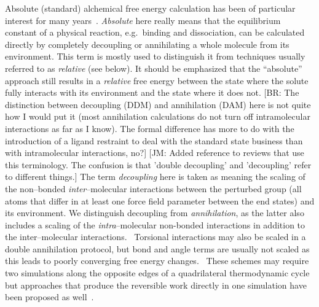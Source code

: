 \documentclass[journal=jctcce,manuscript=article]{achemso}
\begin{document}
Absolute (standard) alchemical free energy calculation has been of
particular interest for many years~\cite{GILSON19971047,
  doi:10.1021/jp0217839, deng_computations_2009, ytreberg_comparison_2006, doi:10.1021/ct500964e, jorgensen1988efficient}.  \emph{Absolute}
here really means that the equilibrium constant of a physical
reaction, e.g.\ binding and dissociation, can be calculated directly
by completely decoupling or annihilating a whole molecule from its environment.
This term is mostly used to distinguish it from techniques usually
referred to as \emph{relative} (see below).  It should be emphasized that the
``absolute'' approach still results in a \emph{relative} free energy
between the state where the solute fully interacts with its environment and the state where it does
not.  
{\color{red}
{\footnotesize [BR: The distinction between decoupling (DDM) and annihilation (DAM) here is not quite how I would put it (most annihilation calculations do not turn off intramolecular interactions as far as I know). 
The formal difference has more to do with the introduction of a ligand restraint to deal with the standard state business than with intramolecular interactions, no?]}}
{\color{blue}
{\footnotesize [JM: Added reference to reviews that use this terminology. The confusion is that 'double decoupling' and 'decoupling' refer to different things.]
}}
The term \emph{decoupling} here is taken as meaning the scaling of the non--bonded \emph{inter}--molecular interactions between the perturbed group (all atoms
that differ in at least one force field parameter between the end states) and
its environment.  We distinguish decoupling from \emph{annihilation},
as the latter also includes a scaling of
the \emph{intra}--molecular non-bonded interactions in addition to the
inter--molecular interactions.~\cite{shirtsmobleyreview_2013} {\color{blue}{\footnotesize [JM: added a reference to review from Shirts and Mobley Methods in Mol. Biol. 924:271-311 (2013) where this is introduced  ]}}  Torsional interactions may also be scaled in a double annihilation protocol, but bond and angle terms are usually not scaled as this leads to poorly converging free energy changes.~\cite{doi:10.1021/jp981628n}
These schemes may require two
simulations along the opposite edges of a quadrilateral thermodynamic cycle
but approaches that produce the reversible work directly in one simulation
have been proposed as well~\cite{doi:10.1063/1.3519057, C3FD00125C}.
\end{document}
